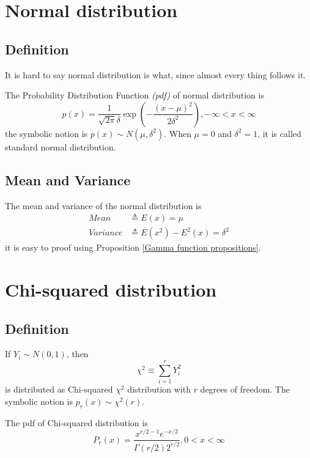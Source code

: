 \documentclass[a4paper]{article}
\begin{document}
\section{Normal distribution}
\subsection{Definition}
It is hard to say normal distribution is what, since almost every thing follows it.

The Probability Distribution Function \emph{(pdf)} of normal distribution is
\begin{equation}
    p(x) = \frac{1}{\sqrt{2\pi}\delta} \exp({-\frac{(x-\mu)^2}{2\delta^2}}), -\infty < x < \infty
\end{equation}
the symbolic notion is $p(x) \sim N(\mu, \delta^2)$.
When $\mu = 0$ and $\delta^2 = 1$, it is called standard normal distribution.

\subsection{Mean and Variance}
The mean and variance of the normal distribution is
\begin{equation*}
    \begin{aligned}
        Mean     & \triangleq E(x) = \mu                 \\
        Variance & \triangleq E(x^2) - E^2(x) = \delta^2
    \end{aligned}
\end{equation*}
it is easy to proof using Proposition \ref{Gamma function propositions}.

\section{Chi-squared distribution}
\subsection{Definition}
If $Y_i \sim N(0, 1)$, then
\begin{equation}
    \chi^2 \equiv \sum_{i = 1}^{r} Y_i^2
\end{equation}
is distributed as Chi-squared \emph{$\chi^2$} distribution with $r$ degrees of freedom.
The symbolic notion is $p_r(x) \sim \chi^2(r)$.

The pdf of Chi-squared distribution is
\begin{equation}
    P_r(x) = \frac{x^{r/2-1} e^{-x/2}}{\Gamma(r/2) 2^{r/2}}, 0 < x < \infty
\end{equation}
\end{document}
